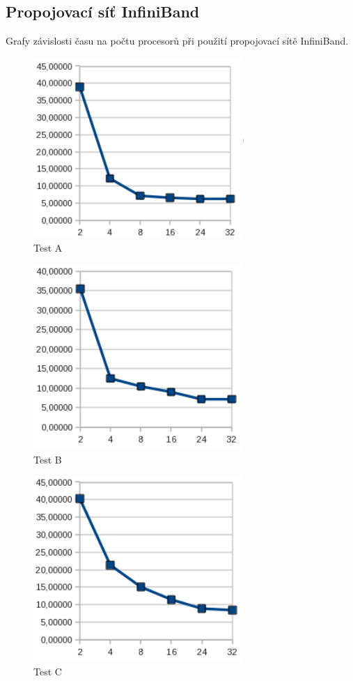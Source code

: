 \documentclass[12pt]{article}
\begin{document}
\subsection{Propojovací síť InfiniBand}
Grafy závislosti času na počtu procesorů při použití propojovací sítě InfiniBand.
\begin{figure}[H]
\begin{center}
\includegraphics[width=8cm]{grafy-zprava/testAinfib.png}
\caption{Test A}
\label{fig:testAinfib}
\end{center}
\end{figure}

\begin{figure}[H]
\begin{center}
\includegraphics[width=8cm]{grafy-zprava/testBinfib.png}
\caption{Test B}
\label{fig:testBinfib}
\end{center}
\end{figure}

\begin{figure}[H]
\begin{center}
\includegraphics[width=8cm]{grafy-zprava/testCinfib.png}
\caption{Test C}
\label{fig:testCinfib}
\end{center}
\end{figure}
\end{document}

